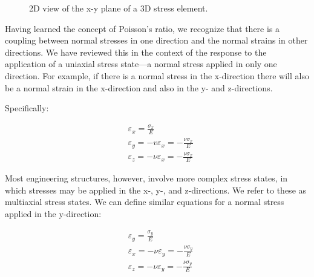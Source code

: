 \documentclass[
  letterpaper,
  DIV=11,
  numbers=noendperiod]{scrreprt}
\theoremstyle{definition}
\theoremstyle{remark}
\begin{document}
\begin{figure}


\caption{\label{fig-4.8}2D view of the x-y plane of a 3D stress
element.}

\end{figure}%

Having learned the concept of Poisson's ratio, we recognize that there
is a coupling between normal stresses in one direction and the normal
strains in other directions. We have reviewed this in the context of the
response to the application of a uniaxial stress state---a normal stress
applied in only one direction. For example, if there is a normal stress
in the x-direction there will also be a normal strain in the x-direction
and also in the y- and z-directions.

Specifically:

\[
\begin{aligned}
& \varepsilon_x=\frac{\sigma_x}{E} \\
& \varepsilon_y=-v \varepsilon_x=-\frac{\nu \sigma_x}{E} \\
& \varepsilon_z=-\nu \varepsilon_x=-\frac{\nu \sigma_x}{E}
\end{aligned}
\]

Most engineering structures, however, involve more complex stress
states, in which stresses may be applied in the x-, y-, and
z-directions. We refer to these as multiaxial stress states. We can
define similar equations for a normal stress applied in the y-direction:

\[
\begin{aligned}
& \varepsilon_y=\frac{\sigma_y}{E} \\
& \varepsilon_x=-\nu \varepsilon_y=-\frac{\nu \sigma_y}{E} \\
& \varepsilon_z=-\nu \varepsilon_y=-\frac{\nu \sigma_y}{E}
\end{aligned}
\]
\end{document}
